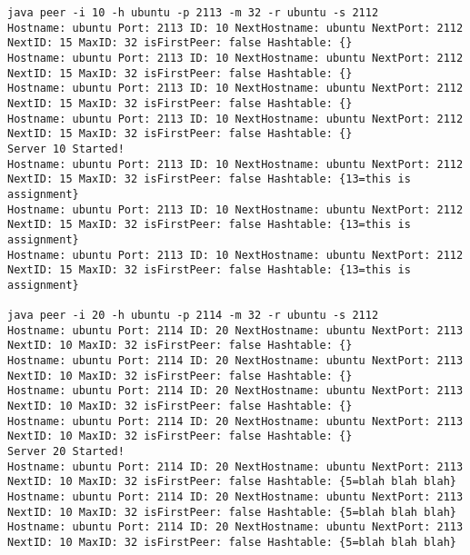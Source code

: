 \documentclass[11pt,a4paper,titlepage]{article}
\begin{document}
\begin{verbatim}
java peer -i 10 -h ubuntu -p 2113 -m 32 -r ubuntu -s 2112
Hostname: ubuntu Port: 2113 ID: 10 NextHostname: ubuntu NextPort: 2112 NextID: 15 MaxID: 32 isFirstPeer: false Hashtable: {}
Hostname: ubuntu Port: 2113 ID: 10 NextHostname: ubuntu NextPort: 2112 NextID: 15 MaxID: 32 isFirstPeer: false Hashtable: {}
Hostname: ubuntu Port: 2113 ID: 10 NextHostname: ubuntu NextPort: 2112 NextID: 15 MaxID: 32 isFirstPeer: false Hashtable: {}
Hostname: ubuntu Port: 2113 ID: 10 NextHostname: ubuntu NextPort: 2112 NextID: 15 MaxID: 32 isFirstPeer: false Hashtable: {}
Server 10 Started!
Hostname: ubuntu Port: 2113 ID: 10 NextHostname: ubuntu NextPort: 2112 NextID: 15 MaxID: 32 isFirstPeer: false Hashtable: {13=this is assignment}
Hostname: ubuntu Port: 2113 ID: 10 NextHostname: ubuntu NextPort: 2112 NextID: 15 MaxID: 32 isFirstPeer: false Hashtable: {13=this is assignment}
Hostname: ubuntu Port: 2113 ID: 10 NextHostname: ubuntu NextPort: 2112 NextID: 15 MaxID: 32 isFirstPeer: false Hashtable: {13=this is assignment}

java peer -i 20 -h ubuntu -p 2114 -m 32 -r ubuntu -s 2112
Hostname: ubuntu Port: 2114 ID: 20 NextHostname: ubuntu NextPort: 2113 NextID: 10 MaxID: 32 isFirstPeer: false Hashtable: {}
Hostname: ubuntu Port: 2114 ID: 20 NextHostname: ubuntu NextPort: 2113 NextID: 10 MaxID: 32 isFirstPeer: false Hashtable: {}
Hostname: ubuntu Port: 2114 ID: 20 NextHostname: ubuntu NextPort: 2113 NextID: 10 MaxID: 32 isFirstPeer: false Hashtable: {}
Hostname: ubuntu Port: 2114 ID: 20 NextHostname: ubuntu NextPort: 2113 NextID: 10 MaxID: 32 isFirstPeer: false Hashtable: {}
Server 20 Started!
Hostname: ubuntu Port: 2114 ID: 20 NextHostname: ubuntu NextPort: 2113 NextID: 10 MaxID: 32 isFirstPeer: false Hashtable: {5=blah blah blah}
Hostname: ubuntu Port: 2114 ID: 20 NextHostname: ubuntu NextPort: 2113 NextID: 10 MaxID: 32 isFirstPeer: false Hashtable: {5=blah blah blah}
Hostname: ubuntu Port: 2114 ID: 20 NextHostname: ubuntu NextPort: 2113 NextID: 10 MaxID: 32 isFirstPeer: false Hashtable: {5=blah blah blah}


\end{verbatim}
\end{document}
